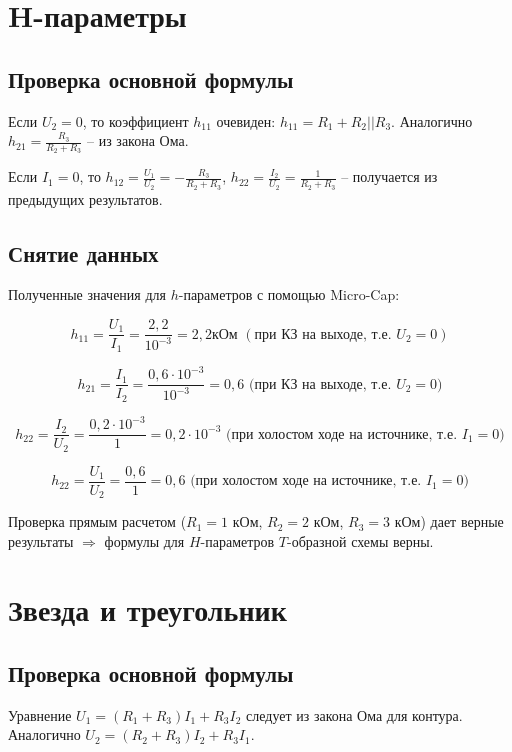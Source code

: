 \documentclass[a4paper, 12pt]{article}%
\begin{document}
\section{H-параметры}

\subsection{Проверка основной формулы}

Если $U_2 = 0$, то коэффициент $h_{11}$ очевиден: $h_{11} = R_1 + R_2 || R_3$. Аналогично $h_{21} = \frac{R_3}{R_2 + R_3}$ -- из закона Ома.

Если $I_1 = 0$, то $h_{12} = \frac{U_1}{U_2} = - \frac{R_3}{R_2 + R_3}$, $h_{22} = \frac{I_2}{U_2} = \frac{1}{R_2 + R_3}$ -- получается из предыдущих результатов.

\subsection{Снятие данных}

Полученные значения для $h$-параметров с помощью Micro-Cap:

\[ h_{11} = \frac{U_1}{I_1} = \frac{2,2}{10^{-3}} = 2,2 \text{кОм } (\text{при КЗ на выходе, т.е. } U_2 = 0) \]

\[ h_{21} = \frac{I_1}{I_2} = \frac{0,6 \cdot 10^{-3}}{10^{-3}} = 0,6  \text{ (при КЗ на выходе, т.е. }U_2 = 0) \]


\[ h_{22} = \frac{I_2}{U_2} = \frac{0,2 \cdot 10^{-3}}{1} = 0,2\cdot 10^{-3}  \text{ (при холостом ходе на источнике, т.е. }I_1 = 0) \]

\[ h_{22} = \frac{U_1}{U_2} = \frac{0,6}{1} = 0,6 \text{ (при холостом ходе на источнике, т.е. }I_1 = 0) \]

Проверка прямым расчетом ($R_1 = 1$ кОм, $R_2 = 2$ кОм, $R_3 = 3$ кОм) дает верные результаты $\Rightarrow$ формулы для $H$-параметров $T$-образной схемы верны.

\section{Звезда и треугольник}

\subsection{Проверка основной формулы}

Уравнение $U_1 = (R_1 + R_3)I_1 + R_3I_2$ следует из закона Ома для контура. Аналогично $U_2 = (R_2 + R_3)I_2 + R_3I_1$.
\end{document}
